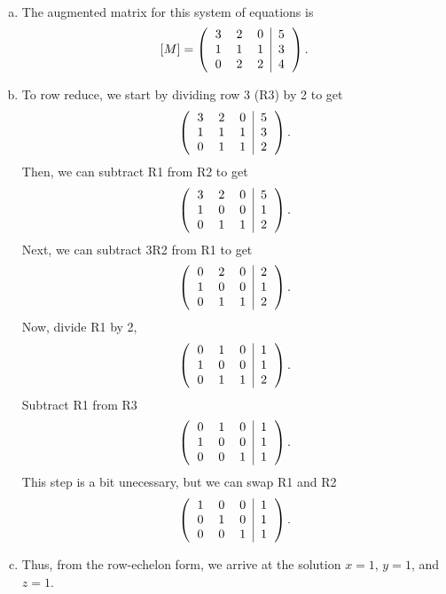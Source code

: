 \documentclass[12pt]{article} %
\begin{document}
\begin{solution}~
    \begin{enumerate}[(a)]
        \item The augmented matrix for this system of equations is
        \[
            [M] = \left( \begin{tabular}{c c c | c} 
                3 & 2 & 0 & 5\\
                1 & 1 & 1 & 3\\
                0 & 2 & 2 & 4
                \end{tabular} \right).
        \]
        \item To row reduce, we start by dividing row 3 (R3) by 2 to get
        \[
            \left( \begin{tabular}{c c c | c} 
                3 & 2 & 0 & 5\\
                1 & 1 & 1 & 3\\
                0 & 1 & 1 & 2
                \end{tabular} \right).
        \]
        Then, we can subtract R1 from R2 to get
        \[
            \left( \begin{tabular}{c c c | c} 
                3 & 2 & 0 & 5\\
                1 & 0 & 0 & 1\\
                0 & 1 & 1 & 2
                \end{tabular} \right).
        \]
        Next, we can subtract 3R2 from R1 to get
        \[
\left( \begin{tabular}{c c c | c} 
                0 & 2 & 0 & 2\\
                1 & 0 & 0 & 1\\
                0 & 1 & 1 & 2
                \end{tabular} \right).
        \]
        Now, divide R1 by 2,
            \[
\left( \begin{tabular}{c c c | c} 
                0 & 1 & 0 & 1\\
                1 & 0 & 0 & 1\\
                0 & 1 & 1 & 2
                \end{tabular} \right).
        \]    
        Subtract R1 from R3
        \[
\left( \begin{tabular}{c c c | c} 
                0 & 1 & 0 & 1\\
                1 & 0 & 0 & 1\\
                0 & 0 & 1 & 1
                \end{tabular} \right).
        \]
        This step is a bit unecessary, but we can swap R1 and R2
        \[
\left( \begin{tabular}{c c c | c} 
                1 & 0 & 0 & 1\\
                0 & 1 & 0 & 1\\
                0 & 0 & 1 & 1
                \end{tabular} \right).
        \]
        \item Thus, from the row-echelon form, we arrive at the solution $x=1$, $y=1$, and $z=1$.
    \end{enumerate}
\end{solution}
\end{document}

